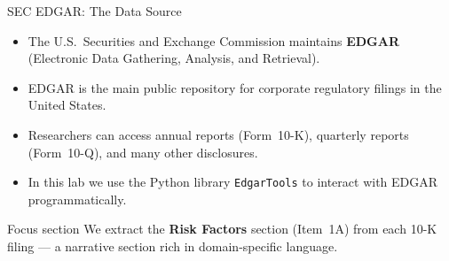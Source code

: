 \documentclass[aspectratio=169,11pt]{beamer}
\begin{document}
\begin{frame}{SEC EDGAR: The Data Source}

\begin{itemize}
  \item The U.S.\ Securities and Exchange Commission maintains
        \textbf{EDGAR} (Electronic Data Gathering, Analysis,
        and Retrieval).
  \item EDGAR is the main public repository for corporate
        regulatory filings in the United States.
  \item Researchers can access annual reports (Form~10-K),
        quarterly reports (Form~10-Q), and many other disclosures.
  \item In this lab we use the Python library \texttt{EdgarTools}
        to interact with EDGAR programmatically.
\end{itemize}

\vspace{6pt}
\begin{block}{Focus section}
We extract the \textbf{Risk Factors} section (Item~1A) from
each 10-K filing --- a narrative section rich in domain-specific
language.
\end{block}

\end{frame}
\end{document}
